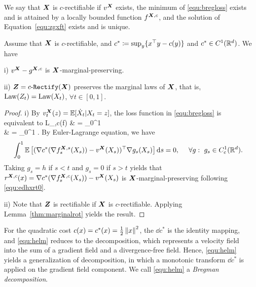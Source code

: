 \begin{mydef}
We say that ${\boldsymbol{X}}$ is $c$-rectifiable if $v^{{\boldsymbol{X}}}$ exists,  
the minimum of \eqref{equ:bregloss} exists and is attained by a locally bounded function $f^{{\boldsymbol{X}}, c}$,
and  %
the solution of %
 Equation~\eqref{equ:zgxft} exists and is unique. %
\end{mydef}   

\begin{thm}\label{thm:marginalgood}
Assume that ${{\boldsymbol{X}}}$ is $c$-rectifiable, 
and $c^*\coloneqq \sup_y \{x^\top y - c(y)\}$ and $c^*\in C^1(\mathbb{R}^d)$. We have 

i) $v^{{\boldsymbol{X}}}- g^{{{\boldsymbol{X}}}, c}$ is ${{\boldsymbol{X}}}$-marginal-preserving. 

ii) ${\boldsymbol{Z}} = c\text{-}\mathtt{Rectify}({\boldsymbol{X}})$ preserves the marginal laws of ${\boldsymbol{X}}$, that is, 
$\mathrm{Law}(Z_t) =\mathrm{Law}(X_t)$, $\forall t\in[0,1]$.
\end{thm}
\begin{proof}
i) 
By $v^{{\boldsymbol{X}}}_t(z) = \mathbb{E}[\dot X_t|X_t=z]$, the loss function in \eqref{equ:bregloss} is equivalent to %
\bb 
L_{\X,c}(f)  
& =  \int_0^1  \dt \\ 
& = \int_0^1  \dt.  
\ee 
By Euler-Lagrange equation, we have 
$$
\int_0^1 \mathbb{E}\left [(\nabla c^*(\nabla f_s^{{{\boldsymbol{X}}},s}(X_s) ) - v^{{\boldsymbol{X}}}(X_s))^\top \nabla g_s(X_s) \right ] \mathrm{d} s = 0, ~~~~ \forall g: ~g_s\in C_{\mathrm{c}}^1(\mathbb{R}^d). 
$$
Taking $g_s = h$ if $s<t$ and $g_s = 0 $ if $s>t$ yields that $r^{{{\boldsymbol{X}}},c}(x) =\nabla c^*(\nabla f_s^{{{\boldsymbol{X}}},c}(X_s) ) - v^{{\boldsymbol{X}}}(X_s)$ is ${\boldsymbol{X}}$-marginal-preserving following \eqref{equ:edhxrt0}. 



ii) Note that ${\boldsymbol{Z}}$ is rectifiable if ${\boldsymbol{X}}$ is $c$-rectifiable.  %
Applying Lemma~\ref{thm:marginalrot} 
yields the result. %
\end{proof}



For the quadratic cost $c(x) = c^*(x) = \frac{1}{2} \left\lVert x\right\rVert^2$, the $\dd c^*$ is the identity mapping, and \eqref{equ:helm} reduces to the {\helm} decomposition,  
  which represents a velocity field into the sum of a gradient field and a divergence-free field. Hence, 
  \eqref{equ:helm} yields a generalization of {\helm} decomposition, in which a monotonic transform $\dd c^*$ is applied on the gradient field component. 
  We call \eqref{equ:helm} a 
  \emph{Bregman {\helm} decomposition}. 

